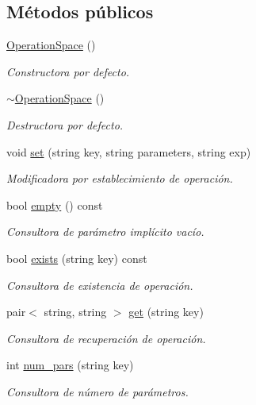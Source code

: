 \subsection*{Métodos públicos}
\begin{DoxyCompactItemize}
\item 
\hyperlink{class_operation_space_a7e3b8f0bede707cc77038ace8152d00f}{Operation\+Space} ()
\begin{DoxyCompactList}\small\item\em Constructora por defecto. \end{DoxyCompactList}\item 
\hyperlink{class_operation_space_a5312b628b76702ca0fb82eb925b9999d}{$\sim$\+Operation\+Space} ()
\begin{DoxyCompactList}\small\item\em Destructora por defecto. \end{DoxyCompactList}\item 
void \hyperlink{class_operation_space_af0370646ebfa97001ea7b21fcac4b3b2}{set} (string key, string parameters, string exp)
\begin{DoxyCompactList}\small\item\em Modificadora por establecimiento de operación. \end{DoxyCompactList}\item 
bool \hyperlink{class_operation_space_abdb93147a79f23d909c896a339371e00}{empty} () const 
\begin{DoxyCompactList}\small\item\em Consultora de parámetro implícito vacío. \end{DoxyCompactList}\item 
bool \hyperlink{class_operation_space_a860a20e7ef047fe60690deb1c155e68a}{exists} (string key) const 
\begin{DoxyCompactList}\small\item\em Consultora de existencia de operación. \end{DoxyCompactList}\item 
pair$<$ string, string $>$ \hyperlink{class_operation_space_af2bcc0acd07952fa40e2cce5dec8c235}{get} (string key)
\begin{DoxyCompactList}\small\item\em Consultora de recuperación de operación. \end{DoxyCompactList}\item 
int \hyperlink{class_operation_space_a21c12c42dc3204e985a5bbe53ef17c4b}{num\+\_\+pars} (string key)
\begin{DoxyCompactList}\small\item\em Consultora de número de parámetros. \end{DoxyCompactList}\item 

\end{DoxyCompactItemize}
